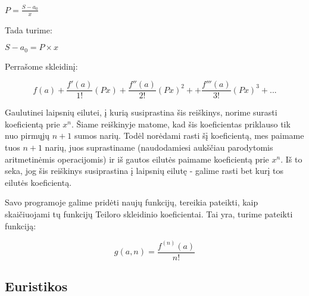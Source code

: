 	$P = \frac{S - a_0}{x}$
	
	Tada turime: 
	
	$S - a_0 = P \times x$
	
	Perrašome skleidinį:
	
	\[f(a) + \frac{f'(a)}{1!}(Px)+\frac{f''(a)}{2!}(Px)^2 + +\frac{f'''(a)}{3!}(Px)^3 + ...\]
	
	Gaulutinei laipsnių eilutei, į kurią susiprastina šis reiškinys, norime surasti koeficientą prie $x^n$. 
	Šiame reiškinyje matome, kad šis koeficientas priklauso tik nuo pirmųjų $n+1$ sumos narių. 
	Todėl norėdami rasti šį koeficientą, mes paimame tuos $n+1$ narių, juos suprastiname (naudodamiesi aukščiau parodytomis aritmetinėmis operacijomis) 
	ir iš gautos eilutės paimame koeficientą prie $x^n$. 
	Iš to seka, jog šis reiškinys susiprastina į laipsnių eilutę - galime rasti bet kurį tos eilutės koeficientą.
	
	Savo programoje galime pridėti naujų funkcijų, tereikia pateikti, kaip skaičiuojami tų funkcijų Teiloro skleidinio koeficientai. 
	Tai yra, turime pateikti funkciją: 
	
	\[ g(a,n) = \frac{f^{(n)}(a)}{n!}\]
	
	
\subsection{Euristikos}
	
	
	